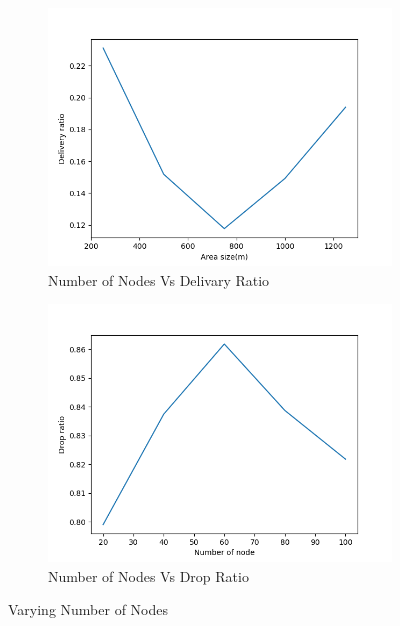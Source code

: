 \documentclass[14pt]{scrartcl} %
\begin{document}
\begin{figure}[h]
\begin{subfigure}{.5\textwidth}
  \includegraphics[width=.8\linewidth]{Graph/areaVsDeliveryRatio.png} 
     \caption{Number of Nodes Vs Delivary Ratio}
     \label{fig-3}
\end{subfigure}
\begin{subfigure}{.5\textwidth}
  \centering
  \includegraphics[width=.8\linewidth]{Graph/nodeVsDropRatio.png} 
    \caption{Number of Nodes Vs Drop Ratio}
     \label{fig-4}
\end{subfigure}
\caption{Varying Number of Nodes}
\label{fig:varyingNode}
\end{figure}
\end{document}
